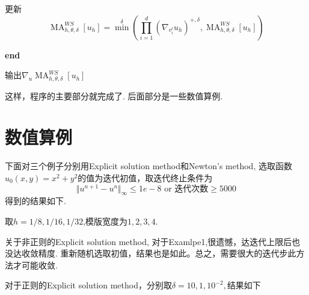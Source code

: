 \documentclass[11pt]{article}
\begin{document}
\begin{algorithm}[H]
\begin{algorithmic}[]
\STATE \qquad 更新
$$\operatorname{MA}_{h,\theta,\delta}^{WS}[u_h]={\min}^{\delta}\left(\prod_{i=1}^d(\nabla{}_{v_i^l}u_h)^{+,\delta},\operatorname{MA}_{h,\theta,\delta}^{WS}[u_h]\right)$$

\STATE  \textbf{end}

\STATE 输出$\nabla{}_u\operatorname{MA}_{h,\theta,\delta}^{WS}[u_h]$
\end{algorithmic}
\end{algorithm}

这样，程序的主要部分就完成了. 后面部分是一些数值算例.

\section{数值算例}

下面对三个例子分别用Explicit solution method和Newton's method, 选取函数$u_0(x,y)=x^2+y^2$的值为迭代初值，取迭代终止条件为
$$\Vert{u^{n+1}-u^n}\Vert_\infty{}\leqslant 1e-8\text{  or  迭代次数} \geqslant 5000$$
得到的结果如下.

取$h = 1/8,1/16,1/32$,模版宽度为$1,2,3,4$.

关于非正则的Explicit solution method, 对于Examlpe1,很遗憾，达迭代上限后也没达收敛精度. 重新随机选取初值，结果也是如此。总之，需要很大的迭代步此方法才可能收敛.

对于正则的Explicit solution method，分别取$\delta=10,1,10^{-2},$结果如下
\end{document}
